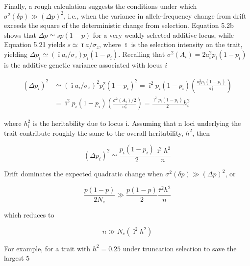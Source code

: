 \documentclass{article}
\begin{document}
Finally, a rough calculation suggests the conditions under which  $ \sigma^2(\delta p) \gg (\Delta p)^2 $, i.e., when the variance in allele-frequency change from drift exceeds the square of the deterministic change from selection. Equation 5.2b shows that  $ \Delta p \simeq sp(1 - p) $ for a very weakly selected additive locus, while Equation 5.21 yields  $ s \simeq \bar{\imath} a / \sigma_z $, where  $ \bar{\imath} $ is the selection intensity on the trait, yielding  $ \Delta p_i \simeq (\bar{\imath} a_i / \sigma_z) p_i (1 - p_i) $. Recalling that  $ \sigma^2(A_i) = 2a_i^2 p_i (1 - p_i) $ is the additive genetic variance associated with locus  $ i $

\begin{equation}
\begin{align*}(\Delta p_{i})^{2}&\simeq(\bar{\imath}a_{i}/\sigma_{z})^{2}p_{i}^{2}(1-p_{i})^{2}=\bar{\imath}^{2}p_{i}(1-p_{i})\left(\frac{a_{i}^{2}p_{i}(1-p_{i})}{\sigma_{z}^{2}}\right)\\&=\bar{\imath}^{2}p_{i}(1-p_{i})\left(\frac{\sigma^{2}(A_{i})/2}{\sigma_{z}^{2}}\right)=\frac{\bar{\imath}^{2}p_{i}(1-p_{i})}{2}h_{i}^{2}\end{align*}
\end{equation}

where  $ h_{i}^{2} $ is the heritability due to locus i. Assuming that n loci underlying the trait contribute roughly the same to the overall heritability,  $ h^{2} $, then

\begin{equation}
(\Delta p_{i})^{2}\simeq\frac{p_{i}(1-p_{i})}{2}\frac{\bar{\imath}^{2}h^{2}}{n}
\tag{18.45a}
\label{eq:18_45a}
\end{equation}

Drift dominates the expected quadratic change when  $ \sigma^{2}(\delta p) \gg (\Delta p)^{2} $, or

\begin{equation}
\frac{p(1-p)}{2N_{e}}\gg\frac{p(1-p)}{2}\frac{\bar{\tau}^{2}h^{2}}{n}
\end{equation}

which reduces to

\begin{equation}
n\gg N_{e}\left(\bar{\imath}^{2}h^{2}\right)
\tag{18.45b}
\label{eq:18_45b}
\end{equation}

For example, for a trait with  $ h^2 = 0.25 $ under truncation selection to save the largest 5%
\end{document}
